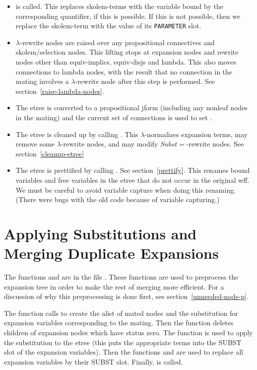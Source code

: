 \begin{itemize}
\item {} is called.
This replaces skolem-terms with the variable bound
by the corresponding quantifier, if this is possible.
If this is not possible, then we replace the skolem-term
with the value of its \verb+PARAMETER+ slot.

\item $\lambda$-rewrite nodes are raised over any propositional connectives
and skolem/selection nodes.  This lifting stops at expansion nodes
and rewrite nodes other than equiv-implics, equiv-disjs and lambda.
This also moves connections to lambda nodes, with the result that
no connection in the mating involves a $\lambda$-rewrite node after
this step is performed.  See section~\ref{raise-lambda-nodes}.

\item The etree is converted to a propositional jform (including any
nonleaf nodes in the mating) and the current set of connections
is used to set .

\item The etree is cleaned up by calling .  This $\lambda$-normalizes
expansion terms, may remove some $\lambda$-rewrite nodes, and may modify $Subst=$-rewrite nodes.
See section~\ref{cleanup-etree}

\item The etree is prettified by calling .  See section~\ref{prettify}.
This renames bound variables and free variables in the etree that do not occur in the original wff.
We must be careful to avoid variable capture when doing this renaming.  (There were bugs with the old code
because of variable capturing.)

\end{itemize}

\section{Applying Substitutions and Merging Duplicate Expansions}\label{etr-merge}

The functions  and 
are in the file {\it{}}.  These functions are used
to preprocess the expansion tree in order to make the rest of merging
more efficient.  For a discussion of why this preprocessing is done
first, see section~\ref{unneeded-node-p}.

The function 
calls  to create the alist of
mated nodes and the substitution for expansion variables corresponding to the mating.
Then the function  deletes children of expansion nodes
which have status zero.  The function 
is used to apply the substitution to the etree (this puts the appropriate terms
into the SUBST slot of the expansion variables).
Then the functions 
and  are used to replace all expansion variables by
their SUBST slot.
Finally,  is called.

